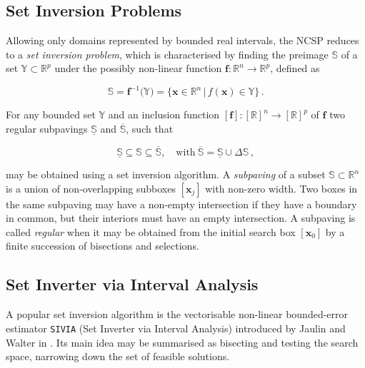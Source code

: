 \subsection{Set Inversion Problems}\label{sec:sip}


Allowing only domains represented by bounded real intervals, the NCSP reduces to a \emph{set inversion problem}, which is characterised by finding the preimage $\mathbb{S}$ of a set $\mathbb{Y} \subset \mathbb{R}^p$ under the possibly non-linear function $\bm{f}: \mathbb{R}^n \rightarrow \mathbb{R}^p$, defined as

\begin{equation}
\mathbb{S} =\bm{f}^{-1}\big(\mathbb{Y}\big) = \big\{ \bm{x} \in \mathbb{R}^n\,|\,f(\bm{x}) \in \mathbb{Y} \big\}\,.
\end{equation}

\noindent
For any bounded set $\mathbb{Y}$ and an inclusion function $[\bm{f}]: [\mathbb{R}]^n \rightarrow [\mathbb{R}]^p$ of $\bm{f}$ two regular subpavings $\underline{\mathbb{S}}$ and $\overline{\mathbb{S}}$, such that

\begin{equation}
\underline{\mathbb{S}} \subseteq \mathbb{S} \subseteq \overline{\mathbb{S}}, \quad \mathrm{with}\: \overline{\mathbb{S}} = \underline{\mathbb{S}} \cup \Delta\mathbb{S} \,,
\end{equation} %

\noindent
may be obtained using a set inversion algorithm. A \emph{subpaving} of a subset $\mathbb{S} \subset \mathbb{R}^n$ is a union of non-overlapping subboxes $[\bm{x}_j]$ with non-zero width. Two boxes in the same subpaving may have a non-empty intersection if they have a boundary in common, but their interiors must have an empty intersection. A subpaving is called \emph{regular} when it may be obtained from the initial search box $[\bm{x}_0]$ by a finite succession of bisections and selections. 


\subsection{Set Inverter via Interval Analysis}\label{sec:sivia}

A popular set inversion algorithm is the vectorisable \cite{herrero:hal-00746047} non-linear bounded-error estimator \texttt{SIVIA} (Set Inverter via Interval Analysis) introduced by Jaulin and Walter in \cite{jaulin1993set}. Its main idea may be summarised as bisecting and testing the search space, narrowing down the set of feasible solutions.

